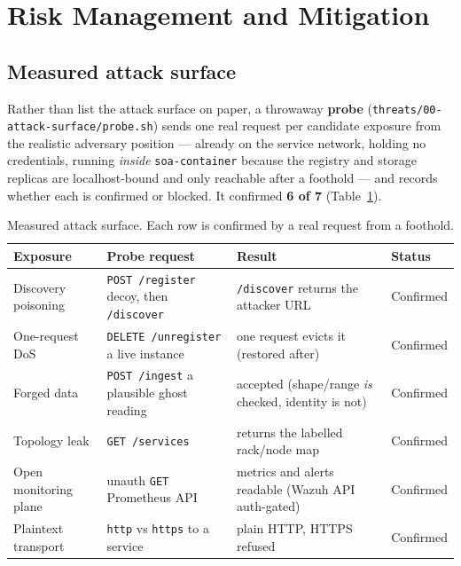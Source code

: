 \documentclass[11pt,a4paper]{article}
\newcommand{\code}[1]{\texttt{\small #1}}
\begin{document}
\section{Risk Management and Mitigation}\label{sec:risk}

\subsection{Measured attack surface}\label{sec:surface}
Rather than list the attack surface on paper, a throwaway \textbf{probe}
(\code{threats/00-attack-surface/probe.sh}) sends one real request per candidate exposure from the
realistic adversary position --- already on the service network, holding no credentials, running
\emph{inside} \code{soa-container} because the registry and storage replicas are localhost-bound and
only reachable after a foothold --- and records whether each is confirmed or blocked. It confirmed
\textbf{6 of 7} (Table~\ref{tab:surface}).

\begin{table}[htbp]
\centering\small
\caption{Measured attack surface. Each row is confirmed by a real request from a foothold.}
\label{tab:surface}
\begin{tabularx}{\linewidth}{@{}l l X l@{}}
\toprule
\textbf{Exposure} & \textbf{Probe request} & \textbf{Result} & \textbf{Status}\\
\midrule
Discovery poisoning  & \code{POST /register} decoy, then \code{/discover} & \code{/discover} returns the attacker URL & Confirmed\\
One-request DoS       & \code{DELETE /unregister} a live instance & one request evicts it (restored after) & Confirmed\\
Forged data           & \code{POST /ingest} a plausible ghost reading & accepted (shape/range \emph{is} checked, identity is not) & Confirmed\\
Topology leak         & \code{GET /services} & returns the labelled rack/node map & Confirmed\\
Open monitoring plane & unauth \code{GET} Prometheus API & metrics and alerts readable (Wazuh API auth-gated) & Confirmed\\
Plaintext transport   & \code{http} vs \code{https} to a service & plain HTTP, HTTPS refused & Confirmed\\
\bottomrule
\end{tabularx}
\end{table}
\end{document}
